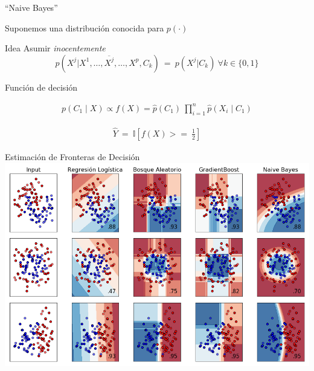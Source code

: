 \documentclass[xcolor=x11names]{beamer}
\begin{document}


\begin{frame}{``Naive Bayes''}

Suponemos una distribución conocida para $p(\cdot)$
	\begin{block}{Idea}
		Asumir \textit{inocentemente}
		$$p(X^j |X^1,\ldots,\overline{X^j},\ldots,X^p, C_k) \ = \ p(X^j | C_k) \ \forall k \in \{0,1\}$$
	\end{block}

	\begin{block}{Función de decisión }

		\begin{align*}
			p(C_1 \mid X) \propto f(X) = \hat{p}(C_{1}) \  \prod_{i=1}^{n} \hat{p}(X_{i}\mid C_{1})
		\end{align*}

		\begin{align*}
			\hat{Y} \ = \ \mathbb{I}\left[  f(X)  >= \ \frac{1}{2} \right]
		\end{align*}

	\end{block}
\end{frame}


\begin{frame}{Estimación de Fronteras de Decisión}
		\includegraphics[width = 0.9 \paperwidth, height = 0.7 \paperheight,
										trim = 0.2 0.2 0.2 0.2cm, left, clip = true]{slides/plot_classifier_comparison.png}
\end{frame}
\end{document}

